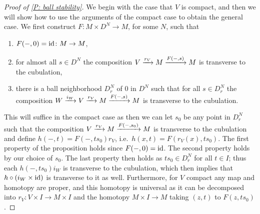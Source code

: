 \begin{proof}[Proof of \cref{P: ball stability}]
We begin with the case that $V$ is compact, and then we will show how to use the arguments of the compact case to obtain the general case. We first construct $F \colon M \times D^N \to M$, for some $N$, such that

\begin{enumerate}

\item $F(-,0) = \mathrm{id} \colon M \to M$,
\item for almost all $s \in D^N$ the composition $V \xrightarrow{r_V} M \xrightarrow{F(-,s)}M$ is transverse to the cubulation,

\item there is a ball neighborhood $D_r^N$ of $0$ in $D^N$ such that for all $s \in D_r^N$ the composition $W \xrightarrow{i_{W}} V \xrightarrow{r_V} M \xrightarrow{F(-,s)}M$ is transverse to the cubulation.
\end{enumerate}



This will suffice in the compact case as then we can let $s_0$ be any point in $D_r^N$ such that the composition $V \xrightarrow{r_V} M \xrightarrow{F(-,s_0)}M$ is transverse to the cubulation and define $h(-,t) = F(-,ts_0)r_V$, i.e.\ $h(x,t) = F(r_V(x),ts_0)$. The first property of the proposition holds since $F(-,0) = \mathrm{id}$. The second property holds by our choice of $s_0$. The last property then holds as $ts_0 \in D_r^N$ for all $t \in I$; thus each $h(-,ts_0)i_W$ is transverse to the cubulation, which then implies that $h\circ(i_{W} \times \mathrm{id})$ is transverse to it as well. Furthermore, for $V$ compact any map and homotopy are proper, and this homotopy is universal as it can be decomposed into $r_V \colon V \times I \to M \times I$ and the homotopy $M \times I \to M$ taking $(z,t)$ to $F(z,ts_0)$.




\end{proof}
